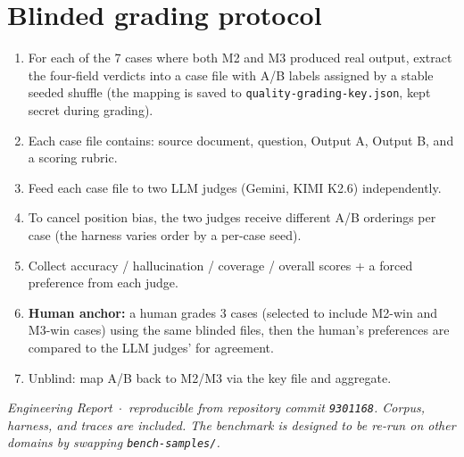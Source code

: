 \documentclass[11pt]{article}
\begin{document}
\section{Blinded grading protocol}

\begin{enumerate}
  \item For each of the 7 cases where both M2 and M3 produced real output,
        extract the four-field verdicts into a case file with A/B labels assigned
        by a stable seeded shuffle (the mapping is saved to
        \texttt{quality-grading-key.json}, kept secret during grading).
  \item Each case file contains: source document, question, Output A, Output B,
        and a scoring rubric.
  \item Feed each case file to two LLM judges (Gemini, KIMI K2.6) independently.
  \item To cancel position bias, the two judges receive different A/B orderings
        per case (the harness varies order by a per-case seed).
  \item Collect accuracy / hallucination / coverage / overall scores + a forced
        preference from each judge.
  \item \textbf{Human anchor:} a human grades 3 cases (selected to include M2-win
        and M3-win cases) using the same blinded files, then the human's
        preferences are compared to the LLM judges' for agreement.
  \item Unblind: map A/B back to M2/M3 via the key file and aggregate.
\end{enumerate}

\bigskip
\noindent\textit{Engineering Report~$\cdot$~reproducible from repository commit
\texttt{9301168}. Corpus, harness, and traces are included. The benchmark is
designed to be re-run on other domains by swapping \texttt{bench-samples/}.}



\end{document}
